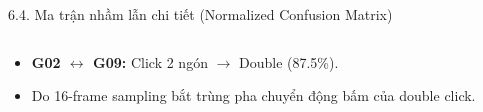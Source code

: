 \documentclass[aspectratio=169,9pt]{beamer}
\newcommand{\smallnote}[1]{{\fontsize{7.1}{8.4}\selectfont #1\par}}
\newcommand{\source}[1]{}
\begin{document}
\begin{frame}{6.4. Ma trận nhầm lẫn chi tiết (Normalized Confusion Matrix)}
\begin{columns}[T,onlytextwidth]
\begin{column}{0.32\textwidth}
\begin{tcolorbox}[keypanel]
{\begin{itemize}
          \item \textbf{G02 $\leftrightarrow$ G09:} Click 2 ngón $\rightarrow$ Double (87.5\%).
          \item \smallnote{Do 16-frame sampling bắt trùng pha chuyển động bấm của double click.}
        \end{itemize}}
      \end{tcolorbox}
    \end{column}
  \end{columns}
  \vfill
  \source{Ma trận nhầm lẫn chuẩn hóa theo nhãn thực tế (True labels) trên 622 đoạn video test.}
\end{frame}
\end{document}
